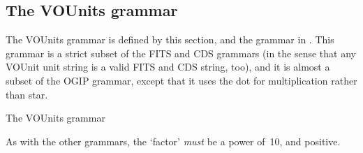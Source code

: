 \documentclass[12pt,notitlepage,onecolumn]{ivoa}
\begin{document}
\subsection{The VOUnits grammar}
\label{sec:vougrammar}

The VOUnits grammar is defined by this section, and the grammar in
.
This grammar is a strict subset of the
FITS and CDS grammars (in the sense that any VOUnit unit string is a
valid FITS and CDS string, too), and it is almost a subset of the OGIP
grammar, except that it uses the dot for multiplication rather than
star.

\begin{table}

\caption{\label{tabx:vougrammar}The VOUnits grammar}
\end{table}
As with the other grammars, the `factor'
\emph{must} be a power of~10, and positive.

\clearpage
\end{document}
